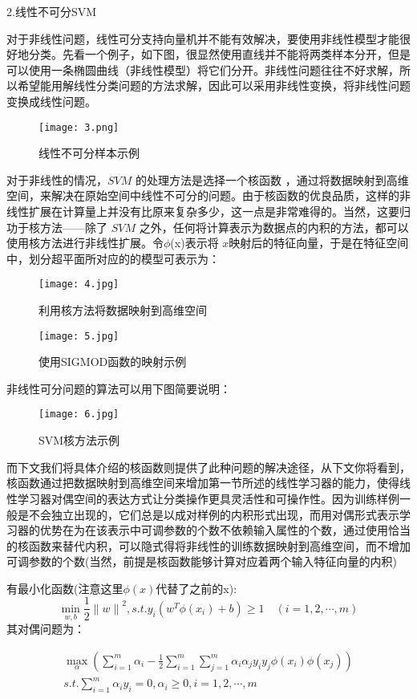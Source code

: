 \documentclass[UTF8]{article}
\begin{document}
2.线性不可分SVM

对于非线性问题，线性可分支持向量机并不能有效解决，要使用非线性模型才能很好地分类。先看一个例子，如下图，很显然使用直线并不能将两类样本分开，但是可以使用一条椭圆曲线（非线性模型）将它们分开。非线性问题往往不好求解，所以希望能用解线性分类问题的方法求解，因此可以采用非线性变换，将非线性问题变换成线性问题。
\begin{figure}[H]
	\centering
	\texttt{[image: 3.png]}
	\caption{线性不可分样本示例}
\end{figure}
对于非线性的情况，$SVM$ 的处理方法是选择一个核函数  ，通过将数据映射到高维空间，来解决在原始空间中线性不可分的问题。由于核函数的优良品质，这样的非线性扩展在计算量上并没有比原来复杂多少，这一点是非常难得的。当然，这要归功于核方法——除了 $SVM$ 之外，任何将计算表示为数据点的内积的方法，都可以使用核方法进行非线性扩展。令$\phi$(x)表示将 $x$映射后的特征向量，于是在特征空间中，划分超平面所对应的的模型可表示为：

\begin{figure}[H]
	\centering
	\texttt{[image: 4.jpg]}
	\caption{利用核方法将数据映射到高维空间}
\end{figure}
\begin{figure}[H]
	\centering
	\texttt{[image: 5.jpg]}
	\caption{使用SIGMOD函数的映射示例}
\end{figure}

非线性可分问题的算法可以用下图简要说明：
\begin{figure}[H]
	\centering
	\texttt{[image: 6.jpg]}
	\caption{SVM核方法示例}
\end{figure}
而下文我们将具体介绍的核函数则提供了此种问题的解决途径，从下文你将看到，核函数通过把数据映射到高维空间来增加第一节所述的线性学习器的能力，使得线性学习器对偶空间的表达方式让分类操作更具灵活性和可操作性。因为训练样例一般是不会独立出现的，它们总是以成对样例的内积形式出现，而用对偶形式表示学习器的优势在为在该表示中可调参数的个数不依赖输入属性的个数，通过使用恰当的核函数来替代内积，可以隐式得将非线性的训练数据映射到高维空间，而不增加可调参数的个数(当然，前提是核函数能够计算对应着两个输入特征向量的内积)

有最小化函数(注意这里$\phi(x)$代替了之前的x):
\begin{equation}
	\min\limits_{w,b}\frac{1}{2}{\lVert w\rVert}^2,s.t.y_i(w^T \phi(x_i)+b)\ge 1\quad (i = 1,2,\cdots,m)
\end{equation}
其对偶问题为：

\begin{equation}
\begin{split}
\label{(14)}
\max\limits_{\alpha}\left(\sum\limits_{i=1}^m\alpha_i-\frac{1}{2}\sum\limits_{i=1}^m\sum\limits_{j=1}^m\alpha_i\alpha_j y_i y_j \phi(x_i) \phi(x_j)\right)\\
s.t.\sum\limits_{i=1}^m\alpha_i y_i= 0,\alpha_i\ge 0,i = 1,2,\cdots,m
\end{split}
\end{equation}
\end{document}
